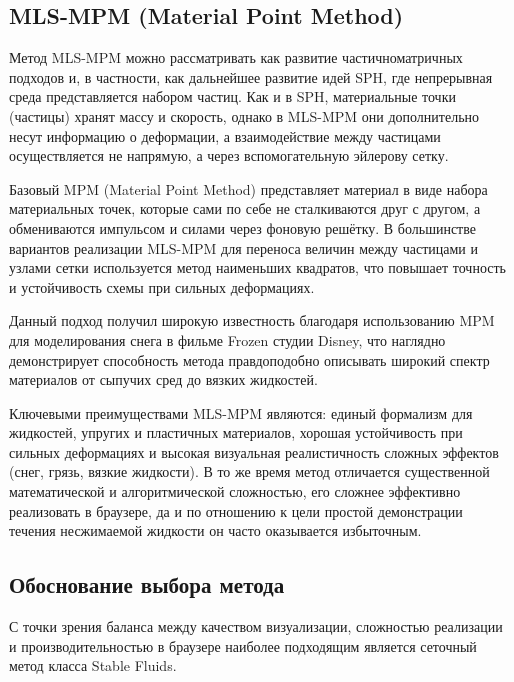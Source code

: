 \subsection{MLS-MPM (Material Point Method)}

Метод MLS-MPM можно рассматривать как развитие частично\-матричных
подходов и, в частности, как дальнейшее развитие идей SPH, где
непрерывная среда представляется набором частиц. Как и в SPH, материальные
точки (частицы) хранят массу и скорость, однако в MLS-MPM они дополнительно
несут информацию о деформации, а взаимодействие между частицами
осуществляется не напрямую, а через вспомогательную эйлерову сетку.

Базовый MPM (Material Point Method) представляет материал в виде
набора материальных точек, которые сами по себе не сталкиваются
друг с другом, а обмениваются импульсом и силами через фоновую
решётку. В большинстве вариантов реализации MLS-MPM для переноса величин между частицами
и узлами сетки используется метод наименьших квадратов, что повышает точность и устойчивость схемы
при сильных деформациях.

Данный подход получил широкую известность благодаря использованию
MPM для моделирования снега в фильме Frozen студии Disney,
что наглядно демонстрирует способность метода правдоподобно
описывать широкий спектр материалов \textemdash{} от сыпучих сред до вязких
жидкостей\cite{webgpuarticle}.

Ключевыми преимуществами MLS-MPM являются:
единый формализм для жидкостей, упругих и пластичных материалов,
хорошая устойчивость при сильных деформациях и высокая визуальная
реалистичность сложных эффектов (снег, грязь, вязкие жидкости).
В то же время метод отличается существенной математической и
алгоритмической сложностью, его сложнее эффективно реализовать
в браузере, да и по отношению к цели простой демонстрации течения несжимаемой жидкости он часто
оказывается избыточным.


\subsection{Обоснование выбора метода}

С точки зрения баланса между качеством визуализации,
сложностью реализации и производительностью в браузере
наиболее подходящим является
сеточный метод класса Stable Fluids.

